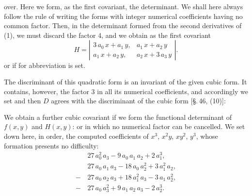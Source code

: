 over. Here we form, as the first  covariant, the  determinant. We shall here always follow the rule of writing the forms with integer numerical coefficients having no common factor. Then, in the determinant formed from the second derivatives of (1), we must discard the factor 4, and we obtain as the first covariant
\[
H = \left|\begin{array}{cc} 3\,a_0\,x + a_1\,y, & a_1\,x + a_2\,y \\ a_1\,x + a_2\,y, & a_2\,x + 3\,a_3\,y \end{array}\right|.
\]
or
if for abbreviation
is set.

The discriminant of this quadratic form is an invariant of the given cubic form. It contains, however, the factor 3 in all its numerical coefficients, and accordingly we set
and then $D$ agrees with the discriminant of the cubic form [\S.\,46, (10)]:

We obtain a further cubic covariant if we form the functional determinant of $f(x,y)$ and $H(x,y)$:
or
in which no numerical factor can be cancelled. We set down here, in order, the computed coefficients of $x^3$, $x^2y$, $xy^2$, $y^3$, whose formation presents no difficulty:
\[
\begin{aligned}
&27\,a_0^2\,a_3 - 9\,a_0\,a_1\,a_2 + 2\,a_1^3,\\
&27\,a_0\,a_1\,a_3 - 18\,a_0\,a_2^2 + 3\,a_1^2\,a_2,\\
-\,&27\,a_0\,a_2\,a_3 + 18\,a_1^2\,a_3 - 3\,a_1\,a_2^2,\\
-\,&27\,a_0\,a_3^2 + 9\,a_1\,a_2\,a_3 - 2\,a_2^3.
\end{aligned}
\]
